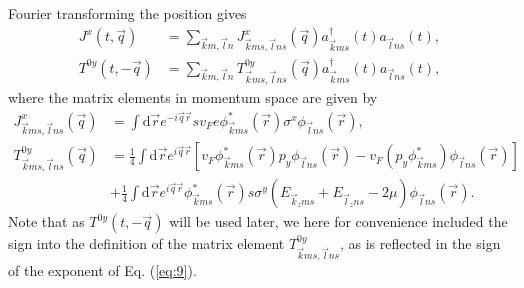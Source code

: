 Fourier transforming the position gives
\begin{align}
  \label{eq:7}
  J^x(t, \vec{q}) &= \sum\limits_{\vec{k}m, \vec{l}n}
                    J^x_{\vec{k}ms, \vec{l}ns}(\vec{q})
                    a^{\dagger}_{\vec{k}ms}(t)
                    a_{\vec{l} ns}(t),\\
  \label{eq:8}
  T^{0y}(t, -\vec{q}) &= \sum\limits_{\vec{k}m, \vec{l}n}^{}
                    T^{0y}_{\vec{k}m s, \vec{l}n s}(\vec{q})
                    a^{\dagger}_{\vec{k}m s}(t)
                    a_{\vec{l} n s}(t),
\end{align}
where the matrix elements in momentum space are given by
\begin{align}
  J^x_{\vec{k}ms, \vec{l}ns}(\vec{q}) &=  \int \mathrm{d} \vec{r} e^{-i \vec{q} \vec{r}} s v_F e \phi ^{*}_{\vec{k}ms} (\vec{r}) \sigma ^x \phi _{\vec{l}ns}(\vec{r}),\\
  \label{eq:9}
  T^{0y}_{\vec{k}m s, \vec{l} n s}(\vec{q}) &= \frac{1}{4} \int \mathrm{d}\vec{r} e^{i\vec{q}\vec{r}} \left[
                                                  v_F \phi ^{*}_{\vec{k} m s}(\vec{r})  p_y \phi _{\vec{l} ns} (\vec{r})
                                                  - v_F (p_y \phi ^{*}_{\vec{k}m s}) \phi _{\vec{l} ns }(\vec{r})
                                                  \right]\\
                                             \nonumber &+ \frac{1}{4}
                                                \int \mathrm{d}\vec{r} e^{i\vec{q}\vec{r}}
                                                \phi ^{*}_{\vec{k}m s}(\vec{r}) s \sigma ^y
                                                (E_{\vec{k}_z m s} + E_{\vec{l}_z n  s} - 2 \mu ) \phi _{\vec{l} n  s}(\vec{r}).
\end{align}
Note that as $T^{0y}(t, -\vec{q})$ will be used later, we here for convenience included the sign into the definition of the matrix element  $T^{0y}_{\vec{k}ms, \vec{l}ns}$, as is reflected in the sign of the exponent of Eq. (\ref{eq:9}).

